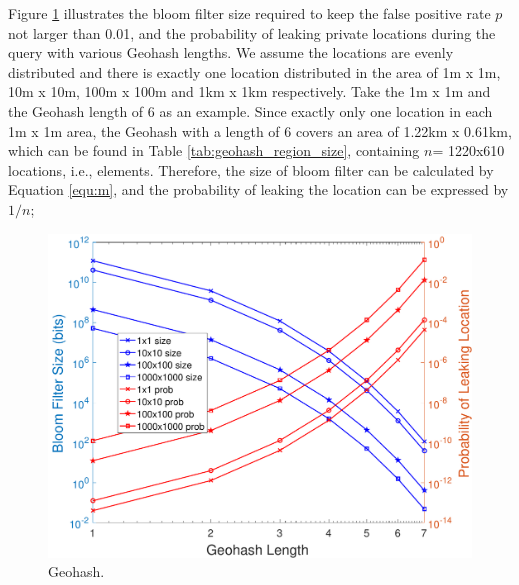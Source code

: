 Figure \ref{fig:geohash_eval} illustrates the bloom filter size required to keep the false positive rate $p$ not larger than 0.01, and the probability of leaking private locations during the query with various Geohash lengths. We assume the locations are evenly distributed and there is exactly one location distributed in the area of 1m x 1m, 10m x 10m, 100m x 100m and 1km x 1km respectively. Take the 1m x 1m and the Geohash length of 6 as an example. Since exactly only one location in each 1m x 1m area, the Geohash with a length of 6 covers an area of 1.22km x 0.61km, which can be found in Table \ref{tab:geohash_region_size}, containing $n$= 1220x610 locations, i.e., elements. Therefore, the size of bloom filter can be calculated by Equation \ref{equ:m}, and the probability of leaking the location can be expressed by $1/n$;

\begin{figure}[h]
    \centering
    \includegraphics[width=0.7\linewidth]{figures/geohash_eval.pdf}
    \caption{Geohash.}
    \label{fig:geohash_eval}
\end{figure}


